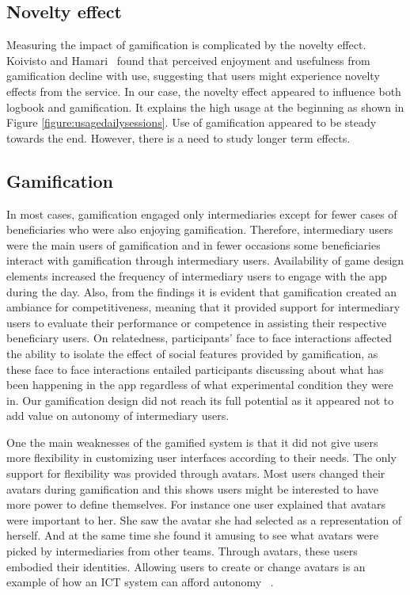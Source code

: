 \documentclass{sig-alternate}
\begin{document}
\subsection*{\textbf{Novelty effect}}
Measuring the impact of gamification is complicated by the novelty effect. Koivisto and Hamari~\cite{koivisto2014demographic} found that perceived enjoyment and usefulness from gamification decline with use, suggesting that users might experience novelty effects from the service. In our case, the novelty effect appeared to influence both logbook and gamification. It explains the high usage at the beginning as shown in Figure \ref{figure:usagedailysessions}. Use of gamification appeared to be steady towards the end. However, there is a need to study longer term effects.

\subsection*{\textbf{Gamification}} 
In most cases, gamification engaged only intermediaries except for fewer cases of beneficiaries who were also enjoying gamification. Therefore, intermediary users were the main users of gamification and in fewer occasions some beneficiaries interact with gamification through intermediary users. Availability of game design elements increased the frequency of intermediary users to engage with the app during the day. Also, from the findings it is evident that gamification created an ambiance for competitiveness, meaning that it provided support for intermediary users to evaluate their performance or competence in assisting their respective beneficiary users. On relatedness, participants' face to face interactions affected the ability to isolate the effect of social features provided by gamification, as these face to face interactions entailed participants discussing about what has been happening in the app regardless of what experimental condition they were in. Our gamification design did not reach its full potential as it appeared not to add value on autonomy of intermediary users. 

One the main weaknesses of the gamified system is that it did not give users more flexibility in customizing user interfaces according to their needs. The only support for flexibility was provided through avatars. Most users changed their avatars during gamification  and this shows users might be interested to have more power to define themselves. For instance one user explained that avatars were important to her. She saw the avatar she had selected as a representation of herself. And at the same time she found it amusing to see what avatars were picked by intermediaries from other teams. Through avatars, these users embodied their identities. Allowing users to create or change avatars is an example of how an ICT system can afford autonomy ~\cite{zhang2008:motivational}.
\end{document}
